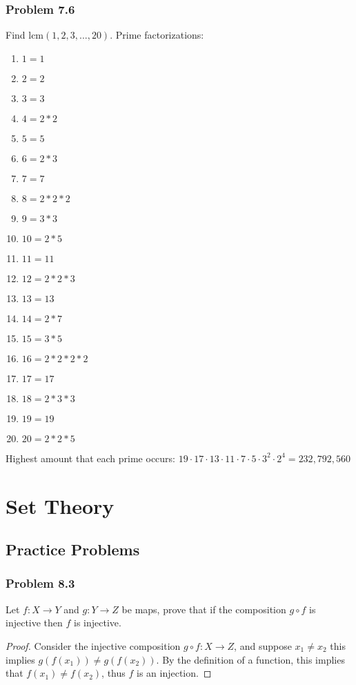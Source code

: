 \documentclass[hidelinks,12pt]{article}
\begin{document}
\subsubsection{Problem 7.6}
Find lcm$(1,2,3,...,20)$.
Prime factorizations:
\begin{enumerate}
    \item $1=1$
    \item $2=2$
    \item $3=3$
    \item $4=2*2$
    \item $5=5$
    \item $6=2*3$
    \item $7=7$
    \item $8=2*2*2$
    \item $9=3*3$
    \item $10=2*5$
    \item $11=11$
    \item $12=2*2*3$
    \item $13=13$
    \item $14=2*7$
    \item $15=3*5$
    \item $16=2*2*2*2$
    \item $17=17$
    \item $18=2*3*3$
    \item $19=19$
    \item $20=2*2*5$
\end{enumerate}
Highest amount that each prime occurs: $19\cdot17\cdot13\cdot11\cdot7\cdot5\cdot3^2\cdot2^4=232,792,560$
\newpage
\section{Set Theory}
\subsection{Practice Problems}
\subsubsection{Problem 8.3}
Let $f:X\to Y$ and $g:Y\to Z$ be maps, prove that if the composition $g\circ f$ is injective then $f$ is injective.
\begin{proof}
Consider the injective composition $g\circ f:X\to Z$, and suppose $x_1\neq x_2$ this implies $g(f(x_1))\neq g(f(x_2))$. By the definition of a function, this implies that $f(x_1)\neq f(x_2)$, thus $f$ is an injection.
\end{proof}
\end{document}
